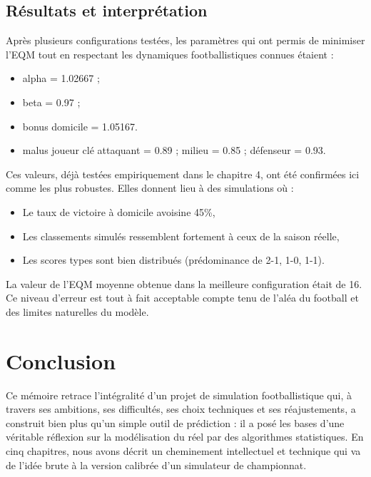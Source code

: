 \documentclass[12pt]{report}
\begin{document}
\section{Résultats et interprétation}

Après plusieurs configurations testées, les paramètres qui ont permis de minimiser l’EQM tout en respectant les dynamiques footballistiques connues étaient :\\
\begin{itemize}
  \item alpha = 1.02667 ;
  \item beta = 0.97 ;
  \item bonus domicile = 1.05167.
  \item malus joueur clé attaquant = 0.89 ; milieu = 0.85 ; défenseur = 0.93.\\
\end{itemize}

Ces valeurs, déjà testées empiriquement dans le chapitre 4, ont été confirmées ici comme les plus robustes. Elles donnent lieu à des simulations où :\\
\begin{itemize}
  \item Le taux de victoire à domicile avoisine 45\%,
  \item Les classements simulés ressemblent fortement à ceux de la saison réelle,
  \item Les scores types sont bien distribués (prédominance de 2-1, 1-0, 1-1).\\
\end{itemize}

La valeur de l’EQM moyenne obtenue dans la meilleure configuration était de 16. Ce niveau d’erreur est tout à fait acceptable compte tenu de l’aléa du football et des limites naturelles du modèle.

\chapter*{Conclusion}

Ce mémoire retrace l’intégralité d’un projet de simulation footballistique qui, à travers ses ambitions, ses difficultés, ses choix techniques et ses réajustements, a construit bien plus qu’un simple outil de prédiction : il a posé les bases d’une véritable réflexion sur la modélisation du réel par des algorithmes statistiques. En cinq chapitres, nous avons décrit un cheminement intellectuel et technique qui va de l’idée brute à la version calibrée d’un simulateur de championnat.
\end{document}
